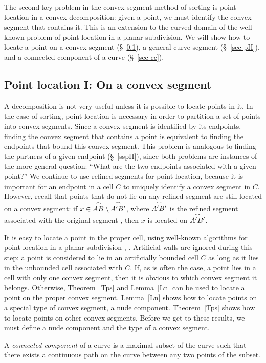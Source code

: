 The second key problem in the convex segment method of sorting is
point location in a convex decomposition: given a point, we must identify
the convex segment that contains it.
This is an extension to the curved domain of the well-known problem of point 
location in a planar subdivision. 
We will show how to locate a point on a convex segment (\S~\ref{sec-pI}), 
a general curve segment (\S~\ref{sec-pII}), and a connected component of a curve
(\S~\ref{sec-cc}).

\subsection{Point location I: On a convex segment}
\label{sec-pI}

A decomposition is not very useful unless it is possible to locate points in it. 
In the case of sorting, point location is necessary in order to partition a set of points
into convex segments.
Since a convex segment is identified by its endpoints, finding the convex 
segment that contains a point is equivalent to finding the endpoints that bound 
this convex segment.
This problem is analogous to finding the partners of a given
endpoint (\S~\ref{sspII}), since both problems are 
instances of the more general question: ``What are the two endpoints associated 
with a given point?''
We continue to use refined segments for point location, 
because it is important for 
an endpoint in a cell $C$ to uniquely identify a convex segment in $C$.
However, recall that points that do not lie on any refined segment are still located
on a convex segment: if $x \in \mbox{$\stackrel{\frown}{AB}$} \setminus \mbox{$\stackrel{\frown}{A'B'}$}$, where $\mbox{$\stackrel{\frown}{A'B'}$}$ 
is the refined segment associated with the original segment , 
then $x$ is located on $\mbox{$\stackrel{\frown}{A'B'}$}$.

It is easy to locate a point in the proper cell, using well-known algorithms 
for point location in a planar subdivision \cite{kirk}, \cite{PS}.
Artificial walls are ignored during this step: a point
is considered to lie in an artificially bounded cell $C$ as long as it lies
in the unbounded cell associated with $C$.
If, as is often the case, a point lies in a cell with only one convex segment, 
then it is obvious to which convex segment it belongs.
Otherwise, Theorem~\ref{Tps} and Lemma~\ref{Ln} can be used 
to locate a point on the proper convex segment.
Lemma~\ref{Ln} shows how to locate points on a special type of convex segment,
a nude component.
Theorem~\ref{Tps} shows how to locate points on other convex segments.
Before we get to these results, we must define a nude component and the type of
a convex segment.
%
\begin{definition}
A {\em connected component} of a curve is a maximal subset of the curve such that 
there exists a continuous path on the curve between any two points of the subset.
\end{definition}

